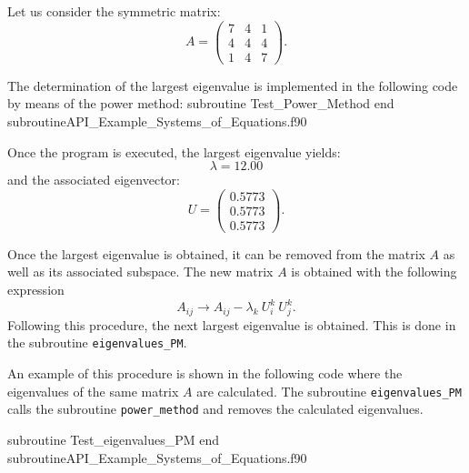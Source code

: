     Let us consider the symmetric matrix:
    \begin{equation*}
    	A = 
    	\begin{pmatrix}
    		7 & 4 & 1 \\
    		4 & 4 & 4 \\
    		1 & 4 & 7
    	\end{pmatrix}.
    \end{equation*}
   
    The determination of the largest eigenvalue is implemented in the following code by means of the power method: 
    \vspace{0.5cm} 
    {subroutine Test_Power_Method}
    {end subroutine}{API_Example_Systems_of_Equations.f90}
    
      Once the program is executed,  the largest eigenvalue yields:
        \begin{equation*}
        	\lambda = 12.00 
        \end{equation*}
    and the associated eigenvector: 
      \begin{equation*}
      	U = \begin{pmatrix}
      		 0.5773 \\
      		 0.5773 \\
      		 0.5773
      	\end{pmatrix}.
      \end{equation*}      
  
    \newpage 
    
    Once the largest eigenvalue is obtained, it can be removed from the matrix $ A $ as well as its associated subspace.
    The new matrix $ A $ is obtained with the following expression  
    $$
     A_{ij} \rightarrow A_{ij} - \lambda_k \  U^k_i \  U^k_j. 
    $$
    Following this procedure, the next largest eigenvalue is obtained. This is done in the subroutine \verb|eigenvalues_PM|.
    
    An example of this procedure is shown in the following code where the eigenvalues of the same matrix $ A $ are calculated. 
    The subroutine \verb|eigenvalues_PM| calls the subroutine \verb|power_method| and removes the calculated eigenvalues.  
    
     
    \vspace{0.5cm} 
    {subroutine Test_eigenvalues_PM}
    {end subroutine}{API_Example_Systems_of_Equations.f90}
    
